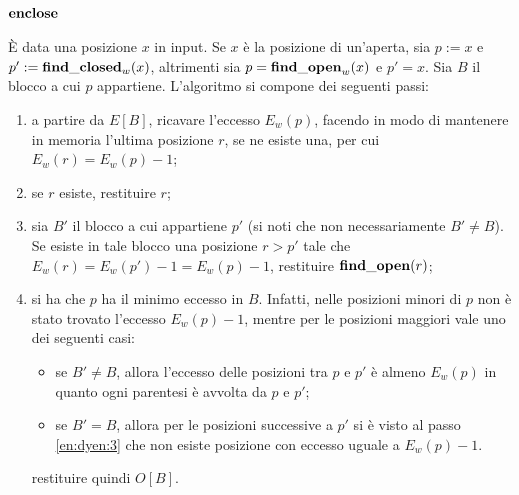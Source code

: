 \paragraph{$\mathbf{enclose}$} È data una posizione $x$ in input.
Se $x$ è la posizione di un'aperta, sia $p:=x$ e $p':=\mathbf{find\_closed}_w(x)$, altrimenti sia $p=\mathbf{find\_open}_w(x)$ e $p'=x$.
Sia $B$ il blocco a cui $p$ appartiene.
L'algoritmo si compone dei seguenti passi:
\begin{enumerate}
	\item a partire da $E[B]$, ricavare l'eccesso $E_w(p)$, facendo in modo di mantenere in memoria l'ultima posizione $r$, se ne esiste una, per cui $E_w(r)=E_w(p)-1$;
	\item se $r$ esiste, restituire $r$;
	\item \label{en:dyen:3} sia $B'$ il blocco a cui appartiene $p'$ (si noti che non necessariamente $B'\neq B$).
	      Se esiste in tale blocco una posizione $r>p'$ tale che $E_w(r)=E_w(p')-1=E_w(p)-1$, restituire $\mathbf{find\_open}(r)$;
	\item si ha che $p$ ha il minimo eccesso in $B$.
	      Infatti, nelle posizioni minori di $p$ non è stato trovato l'eccesso $E_w(p)-1$, mentre per le posizioni maggiori vale uno dei seguenti casi:
	      \begin{itemize}
		      \item se $B'\neq B$, allora l'eccesso delle posizioni tra $p$ e $p'$ è almeno $E_w(p)$ in quanto ogni parentesi è avvolta da $p$ e $p'$;
		      \item se $B'=B$, allora per le posizioni successive a $p'$ si è visto al passo \ref{en:dyen:3} che non esiste posizione con eccesso uguale a $E_w(p)-1$.
	      \end{itemize}
	      restituire quindi $O[B]$.
\end{enumerate}

